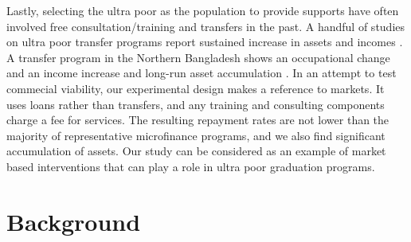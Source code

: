 	Lastly, selecting the ultra poor as the population to provide supports have often involved free consultation/training and transfers in the past. A handful of studies on ultra poor transfer programs report sustained increase in assets and incomes \citep{Blattman2014, BanerjeeetalScience2015, Blattmanetal2016, HaushoferShapiro2016}. A transfer program in the Northern Bangladesh shows an occupational change and an income increase \citep{BandieraBRAC2017} and long-run asset accumulation \citep{Balboni2020}. %
	In an attempt to test commecial viability, our experimental design makes a reference to markets. It uses loans rather than transfers, and any training and consulting components charge a fee for services. The resulting repayment rates are not lower than the majority of representative microfinance programs, and we also find significant accumulation of assets. Our study can be considered as an example of market based interventions that can play a role in ultra poor graduation programs.


\section{Background}
\label{SecBackground}


